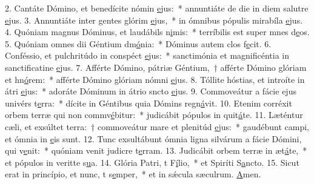 2. Cantáte Dómino, et benedícite nómin \uline{e}jus:~* annuntiáte de die in diem salutre \uline{e}jus.
3. Annuntiáte inter gentes glórim \uline{e}jus,~* in ómnibus pópulis mirabíla \uline{e}jus.
4. Quóniam magnus Dóminus, et laudábils n\uline{i}mis:~* terríbilis est super mnes d\uline{e}os.
5. Quóniam omnes dii Géntium dm\uline{ó}nia:~* Dóminus autem clos f\uline{e}cit.
6. Conféssio, et pulchritúdo in conspéct \uline{e}jus:~* sanctimónia et magnificéntia in sanctificatine \uline{e}jus.
7. Afférte Dómino, pátriæ Géntium,~† afférte Dómino glóriam et hn\uline{ó}rem:~* afférte Dómino glóriam nómni \uline{e}jus.
8. Tóllite hóstias, et introíte in átri \uline{e}jus:~* adoráte Dóminum in átrio sncto \uline{e}jus.
9. Commoveátur a fácie ejus univérs t\uline{e}rra:~* dícite in Géntibus quia Dómins regn\uline{á}vit.
10. Etenim corréxit orbem terræ qui non commv\uline{é}bitur:~* judicábit pópulos in quit\uline{á}te.
11. Læténtur cæli, et exsúltet terra:~† commoveátur mare et plenitúd \uline{e}jus:~* gaudébunt campi, et ómnia  in \uline{e}is sunt.
12. Tunc exsultábunt ómnia ligna silvárum a fácie Dómini, qui v\uline{e}nit:~* quóniam venit judicre t\uline{e}rram.
13. Judicábit orbem terræ in æt\uline{á}te,~* et pópulos in veritte s\uline{u}a.
14. Glória Patri, t F\uline{í}lio,~* et Spiríti S\uline{a}ncto.
15. Sicut erat in princípio, et nunc, t s\uline{e}mper,~* et in sǽcula sæculrum. \uline{A}men.
